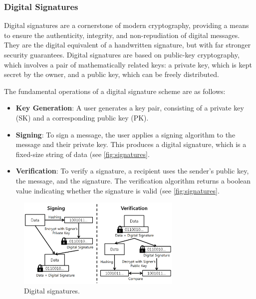 \subsubsection{Digital Signatures}\label{digital-signatures}

Digital signatures are a cornerstone of modern cryptography, providing a
means to ensure the authenticity, integrity, and non-repudiation of
digital messages. They are the digital equivalent of a handwritten
signature, but with far stronger security guarantees. Digital signatures
are based on public-key cryptography, which involves a pair of
mathematically related keys: a private key, which is kept secret by the
owner, and a public key, which can be freely distributed.

The fundamental operations of a digital signature scheme are as follows:

\begin{itemize}
	\tightlist
	\item
	\textbf{Key Generation}: A user generates a key pair, consisting of a
	private key (SK) and a corresponding public key (PK).
	\item
	\textbf{Signing}: To sign a message, the user applies a signing
	algorithm to the message and their private key. This produces a
	digital signature, which is a fixed-size string of data (see \autoref{fig:signatures}.
	\item
	\textbf{Verification}: To verify a signature, a recipient uses the
	sender's public key, the message, and the signature. The verification
	algorithm returns a boolean value indicating whether the signature is
	valid (see \autoref{fig:signatures}.
\end{itemize}

\begin{figure}[t]
	\begin{center}
		\includegraphics[width=0.7\textwidth]{./figs/signatures.png} 
		\caption{Digital signatures.}		
		\label{fig:signatures}
	\end{center}	
\end{figure}

